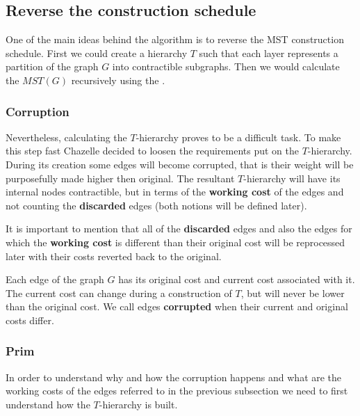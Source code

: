 \subsection{Reverse the construction schedule}
One of the main ideas behind the algorithm is to reverse the MST construction schedule. First we could create a hierarchy $T$ such that each layer represents a partition of the graph $G$ into contractible subgraphs. Then we would calculate the $MST(G)$ recursively using the .

\subsubsection{Corruption}
Nevertheless, calculating the $T$-hierarchy proves to be a difficult task. To make this step fast Chazelle decided to loosen the requirements put on the $T$-hierarchy. During its creation some edges will become corrupted, that is their weight will be purposefully made higher then original. The resultant $T$-hierarchy will have its internal nodes contractible, but in terms of the \textbf{working cost} of the edges and not counting the \textbf{discarded} edges (both notions will be defined later). 

It is important to mention that all of the \textbf{discarded} edges and also the edges for which the \textbf{working cost} is different than their original cost will be reprocessed later with their costs reverted back to the original.

\begin{remark}
    Each edge of the graph $G$ has its original cost and current cost associated with it. The current cost can change during a construction of $T$, but will never be lower than the original cost. We call edges \textbf{corrupted} when their current and original costs differ.

\end{remark}

\subsubsection{Prim}
In order to understand why and how the corruption happens and what are the working costs of the edges referred to in the previous subsection we need to first understand how the $T$-hierarchy is built. 

